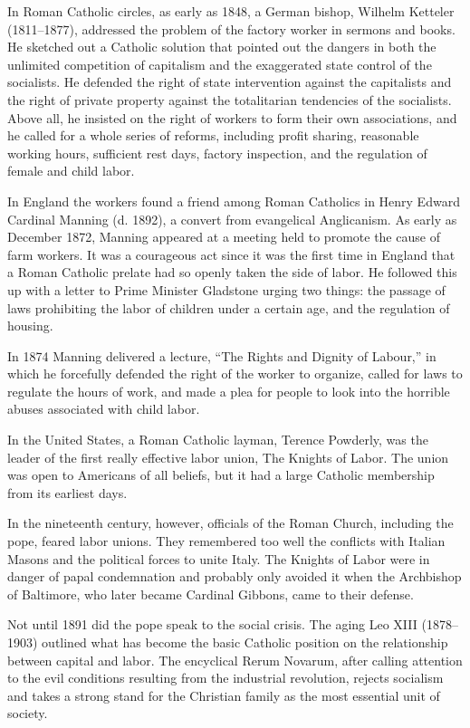 In Roman Catholic circles, as early as 1848, a German bishop, Wilhelm Ketteler (1811–1877),
addressed the problem of the factory worker in sermons and books. He sketched out a Catholic
solution that pointed out the dangers in both the unlimited competition of capitalism and the
exaggerated state control of the socialists. He defended the right of state intervention against the
capitalists and the right of private property against the totalitarian tendencies of the socialists.
Above all, he insisted on the right of workers to form their own associations, and he called for a
whole series of reforms, including profit sharing, reasonable working hours, sufficient rest days,
factory inspection, and the regulation of female and child labor.

In England the workers found a friend among Roman Catholics in Henry Edward Cardinal Manning (d.
1892), a convert from evangelical Anglicanism. As early as December 1872, Manning appeared at a
meeting held to promote the cause of farm workers. It was a courageous act since it was the first
time in England that a Roman Catholic prelate had so openly taken the side of labor. He followed
this up with a letter to Prime Minister Gladstone urging two things: the passage of laws prohibiting
the labor of children under a certain age, and the regulation of housing.

In 1874 Manning delivered a lecture, “The Rights and Dignity of Labour,” in which he forcefully
defended the right of the worker to organize, called for laws to regulate the hours of work, and
made a plea for people to look into the horrible abuses associated with child labor.

In the United States, a Roman Catholic layman, Terence Powderly, was the leader of the first really
effective labor union, The Knights of Labor. The union was open to Americans of all beliefs, but it
had a large Catholic membership from its earliest days.

In the nineteenth century, however, officials of the Roman Church, including the pope, feared labor
unions. They remembered too well the conflicts with Italian Masons and the political forces to unite
Italy. The Knights of Labor were in danger of papal condemnation and probably only avoided it when
the Archbishop of Baltimore, who later became Cardinal Gibbons, came to their defense.

Not until 1891 did the pope speak to the social crisis. The aging Leo XIII (1878–1903) outlined what
has become the basic Catholic position on the relationship between capital and labor. The encyclical
Rerum Novarum, after calling attention to the evil conditions resulting from the industrial
revolution, rejects socialism and takes a strong stand for the Christian family as the most
essential unit of society.

